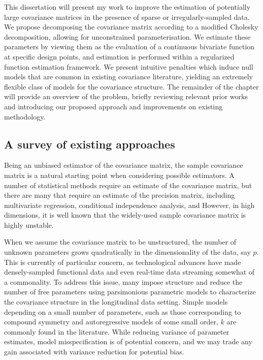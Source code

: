 This dissertation will present my work to improve the estimation of potentially large covariance matrices in the presence of sparse or irregularly-sampled data. We propose decomposing the covariance matrix according to a modified Cholesky decomposition,  allowing for unconstrained parameterisation. We estimate these parameters by viewing them as the evaluation of a continuous bivariate function at specific design points, and estimation is performed within a regularized function estimation framework. We present intuitive penalties which induce null models that are common in existing covariance literature, yielding an extremely flexible class of models for the covariance structure. The remainder of the chapter will provide an overview of the problem, briefly reviewing relevant prior works and introducing our proposed approach and improvements on existing methodology. 

\subsection{A survey of existing approaches}


Being an unbiased estimator of the covariance matrix, the sample covariance matrix is a natural starting point when considering possible estimators. A number of statistical methods require an estimate of the covariance matrix, but there are many that require an estimate of the precision matrix, including multivariate regression, conditional independence analysis, and However, in high dimensions, it is well known that the widely-used sample covariance matrix is highly unstable. 


When we assume the covariance matrix to be unstructured, the number of unknown parameters grows quadratically in the dimensionality of the data, say $p$. This is currently of particular concern, as technological advances have made densely-sampled functional data and even real-time data streaming somewhat of a commonality. To address this issue, many impose structure and reduce the number of free parameters using parsimonious parametric models to characterize the covariance structure in the longitudinal data setting. Simple models depending on a small number of parameters, such as those corresponding to compound symmetry and autoregressive models of some small order, $k$ are commonly found in the literature. While reducing variance of parameter estimates, model misspecification is of potential concern, and we may trade any gain associated with variance reduction for potential bias. 

